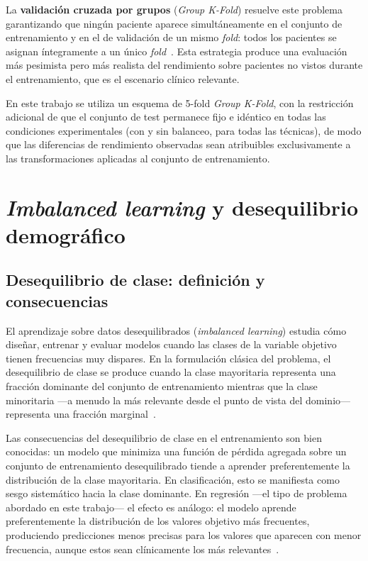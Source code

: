 La \textbf{validación cruzada por grupos} (\emph{Group K-Fold}) resuelve este problema garantizando que ningún paciente aparece simultáneamente en el conjunto de entrenamiento y en el de validación de un mismo \emph{fold}: todos los pacientes se asignan íntegramente a un único \emph{fold}~\cite{groupkfold_sklearn}. Esta estrategia produce una evaluación más pesimista pero más realista del rendimiento sobre pacientes no vistos durante el entrenamiento, que es el escenario clínico relevante.

En este trabajo se utiliza un esquema de 5-fold \emph{Group K-Fold}, con la restricción adicional de que el conjunto de test permanece fijo e idéntico en todas las condiciones experimentales (con y sin balanceo, para todas las técnicas), de modo que las diferencias de rendimiento observadas sean atribuibles exclusivamente a las transformaciones aplicadas al conjunto de entrenamiento.

\section{\emph{Imbalanced learning} y desequilibrio demográfico}
\label{sec:imbalanced_learning}

\subsection{Desequilibrio de clase: definición y consecuencias}
\label{subsec:class_imbalance}

El aprendizaje sobre datos desequilibrados (\emph{imbalanced learning}) estudia cómo diseñar, entrenar y evaluar modelos cuando las clases de la variable objetivo tienen frecuencias muy dispares. En la formulación clásica del problema, el desequilibrio de clase se produce cuando la clase mayoritaria representa una fracción dominante del conjunto de entrenamiento mientras que la clase minoritaria —a menudo la más relevante desde el punto de vista del dominio— representa una fracción marginal~\cite{he2009learning}.

Las consecuencias del desequilibrio de clase en el entrenamiento son bien conocidas: un modelo que minimiza una función de pérdida agregada sobre un conjunto de entrenamiento desequilibrado tiende a aprender preferentemente la distribución de la clase mayoritaria. En clasificación, esto se manifiesta como sesgo sistemático hacia la clase dominante. En regresión —el tipo de problema abordado en este trabajo— el efecto es análogo: el modelo aprende preferentemente la distribución de los valores objetivo más frecuentes, produciendo predicciones menos precisas para los valores que aparecen con menor frecuencia, aunque estos sean clínicamente los más relevantes~\cite{branco2016survey}.

